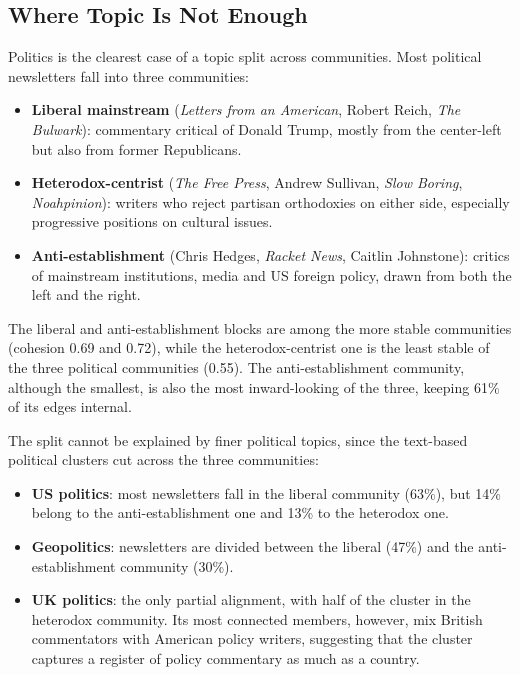 \documentclass[sigchi]{acmart}
\begin{document}
\subsection{Where Topic Is Not Enough}
\label{sec:stance}

Politics is the clearest case of a topic split across communities. Most
political newsletters fall into three communities:
\begin{itemize}
  \item \textbf{Liberal mainstream} (\emph{Letters from an American},
  Robert Reich, \emph{The Bulwark}): commentary critical of Donald
  Trump, mostly from the center-left but also from former Republicans.
  \item \textbf{Heterodox-centrist} (\emph{The Free Press}, Andrew
  Sullivan, \emph{Slow Boring}, \emph{Noahpinion}): writers who reject
  partisan orthodoxies on either side, especially progressive positions on cultural issues.
  \item \textbf{Anti-establishment} (Chris Hedges, \emph{Racket News}, Caitlin Johnstone): critics of mainstream institutions, media and US foreign policy, drawn from both the left and the right.
\end{itemize}
The liberal and anti-establishment blocks are among the more stable communities (cohesion 0.69 and 0.72), while the heterodox-centrist one is the least stable of the three political communities (0.55). The anti-establishment community, although the smallest, is also the
most inward-looking of the three, keeping 61\% of its edges internal.

The split cannot be explained by finer political topics, since the text-based political clusters cut across the three communities:
\begin{itemize}
  \item \textbf{US politics}: most newsletters fall in the liberal
  community (63\%), but 14\% belong to the anti-establishment one and
  13\% to the heterodox one.
  \item \textbf{Geopolitics}: newsletters are divided between the
  liberal (47\%) and the anti-establishment community (30\%).
  \item \textbf{UK politics}: the only partial alignment, with half of
  the cluster in the heterodox community. Its most connected members,
  however, mix British commentators with American policy writers,
  suggesting that the cluster captures a register of policy commentary
  as much as a country.
\end{itemize}
\end{document}
